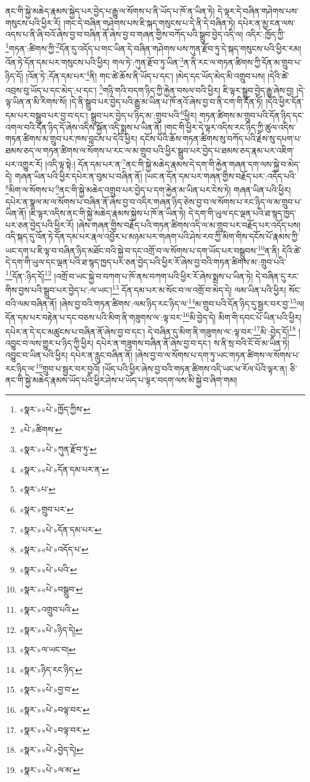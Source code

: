 ནང་གི་སྐྱེ་མཆེད་རྣམས་སྐྱེད་པར་བྱེད་པ་རྒྱུ་ལ་སོགས་པ་ནི་ཡོད་པ་ཁོ་ན་ཡིན་ཏེ། དེ་ལྟར་དེ་བཞིན་གཤེགས་པས་གསུངས་པའི་ཕྱིར་རོ། །གང་དེ་བཞིན་གཤེགས་པས་ཇི་སྐད་གསུངས་པ་དེ་ནི་དེ་བཞིན་ཏེ། དཔེར་ན་མྱ་ངན་ལས་འདས་པ་ནི་ཞི་བའོ་ཞེས་བྱ་བ་བཞིན་ནོ་ཞེས་བྱ་བ་གཞན་གྱིས་བཀོད་པའི་སྒྲུབ་བྱེད་འདི་ལ། འདིར་:ཁྱོད་ཀྱི་\footnote{«སྣར་»«པེ་»ཁྱོད་ཀྱིས་}གཏན་:ཚིགས་ཀྱི་\footnote{«པེ་»ཚིགས་}དོན་དུ་འདོད་པ་གང་ཡིན་དེ་བཞིན་གཤེགས་པས་ཀུན་རྫོབ་ཏུ་དེ་སྐད་གསུངས་པའི་ཕྱིར་རམ། འོན་ཏེ་དོན་དམ་པར་གསུངས་པའི་ཕྱིར། གལ་ཏེ་:ཀུན་རྫོབ་ཏུ་ཡིན་\footnote{«སྣར་»«པེ་»ཀུན་རྫོབ་ཏུ་}ན་ནི་རང་ལ་གཏན་ཚིགས་ཀྱི་དོན་མ་གྲུབ་པ་ཉིད་དོ། །འོན་ཏེ་:དོན་དམ་པར་\footnote{«སྣར་»«པེ་»དོན་དམ་པར་ན་}ནི། གང་ཚེ་ཆོས་ནི་ཡོད་པ་དང་། །མེད་དང་ཡོད་མེད་མི་འགྲུབ་པས། །དེའི་ཚེ་འབྲས་བུ་ཡོད་པ་དང་མེད་:པ་དང་། \footnote{«སྣར་»པ་}གཉི་གའི་བདག་ཉིད་ཀྱི་རྐྱེན་བསལ་བའི་ཕྱིར། ཇི་ལྟར་སྒྲུབ་བྱེད་རྒྱུ་ཞེས་བྱ། །དེ་ལྟ་ཡིན་ན་མི་རིགས་སོ། །དེ་ནི་སྒྲུབ་པར་བྱེད་པའི་རྒྱུ་མ་ཡིན་པ་ཁོ་ནའོ་ཞེས་བྱ་བ་ནི་ངག་གི་དོན་ཏོ། །དེའི་ཕྱིར་དོན་དམ་པར་བསྒྲུབ་པར་བྱ་བ་དང་། སྒྲུབ་པར་བྱེད་པ་ཉིད་མ་:གྲུབ་པའི་\footnote{«སྣར་»གྲུབ་པར་}ཕྱིར། གཏན་ཚིགས་མ་གྲུབ་པའི་དོན་ཉིད་དང་འགལ་བའི་དོན་ཉིད་དོ་ཞེས་འདིས་སྐྱོན་འདི་སྨྲས་པ་ཡིན་ནོ། །གང་གི་ཕྱིར་དེ་ལྟར་འདིས་རང་ཉིད་ཀྱི་ཚུལ་འདིས་གཏན་ཚིགས་མ་གྲུབ་པར་ཁས་བླངས་པ་དེའི་ཕྱིར། དངོས་པོའི་ཆོས་གཏན་ཚིགས་སུ་བཀོད་པའི་རྗེས་སུ་དཔག་པ་ཐམས་ཅད་ལ་གཏན་ཚིགས་ལ་སོགས་པ་རང་ལ་མ་གྲུབ་པའི་ཕྱིར་སྒྲུབ་པར་བྱེད་པ་ཐམས་ཅད་རྣམ་པར་འཇིག་པར་འགྱུར་རོ། །འདི་ལྟ་སྟེ:། དོན་དམ་པར་ན་\footnote{«སྣར་»«པེ་»དོན་དམ་པར་}ནང་གི་སྐྱེ་མཆེད་རྣམས་དེ་དག་གི་རྐྱེན་གཞན་དག་ལས་སྐྱེ་བ་མེད་དེ། གཞན་ཡིན་པའི་ཕྱིར་དཔེར་ན་བུམ་པ་བཞིན་ནོ། །ཡང་ན་དོན་དམ་པར་གཞན་གྱིས་བརྗོད་པར་:འདོད་པའི་\footnote{«སྣར་»«པེ་»འདོད་པ་}མིག་ལ་སོགས་པ་\footnote{«སྣར་»«པེ་»པའི་}ནང་གི་སྐྱེ་མཆེད་འགྲུབ་པར་བྱེད་པ་དག་རྐྱེན་མ་ཡིན་པར་ངེས་ཏེ། གཞན་ཡིན་པའི་ཕྱིར། དཔེར་ན་སྣལ་མ་ལ་སོགས་པ་བཞིན་ནོ་ཞེས་བྱ་བ་འདིར་གཞན་ཉིད་ཅེས་བྱ་བ་ལ་སོགས་པ་རང་ཉིད་ལ་མ་གྲུབ་པ་ཡིན་ནོ། །ཇི་ལྟར་འདིས་ནང་གི་སྐྱེ་མཆེད་རྣམས་སྐྱེས་པ་ཁོ་ན་ཡིན་ཏེ། དེ་དག་གི་ཡུལ་དང་ལྡན་པའི་ཐ་སྙད་ཁྱད་པར་ཅན་བྱེད་པའི་ཕྱིར་རོ། །ཞེས་གཞན་གྱིས་བརྗོད་པའི་གཏན་ཚིགས་འདི་ལ་མ་གྲུབ་པར་བརྗོད་པར་འདོད་པས། འདི་སྐད་དུ་འོན་ཏེ་དོན་དམ་པར་རྣལ་འབྱོར་པ་མཉམ་པར་གཞག་པའི་ཤེས་རབ་ཀྱི་མིག་གིས་དངོས་པོ་རྣམས་ཀྱི་ཡང་དག་པ་ཇི་ལྟ་བ་བཞིན་ཉིད་མཐོང་བའི་སྐྱེ་བ་དང་འགྲོ་བ་ལ་སོགས་པ་དག་ཡོད་པར་བསྒྲུབས་\footnote{«སྣར་»«པེ་»བསྒྲུབ་}ན་ནི། དེའི་ཚེ་དེ་དག་གི་ཡུལ་དང་ལྡན་པའི་ཐ་སྙད་ཁྱད་པར་ཅན་བྱེད་པའི་ཕྱིར་རོ་ཞེས་བྱ་བའི་གཏན་ཚིགས་མ་:གྲུབ་པའི་\footnote{«སྣར་»འགྲུབ་པའི་}དོན་:ཉིད་དོ།\footnote{«སྣར་»«པེ་»ཉིད་དེ།} །འགྲོ་བ་ཡང་སྐྱེ་བ་བཀག་པ་ཁོ་ནས་བཀག་པའི་ཕྱིར་རོ་ཞེས་སྨྲས་པ་ཡིན་ཏེ། དེ་བཞིན་དུ་རང་གིས་བྱས་པའི་སྒྲུབ་པར་བྱེད་པ་:ལ་ཡང་།\footnote{«སྣར་»ལ་ཡང་བ།} དོན་དམ་པར་མ་སོང་བ་ལ་འགྲོ་བ་མེད་དེ། ལམ་ཡིན་པའི་ཕྱིར། སོང་བའི་ལམ་བཞིན་ནོ། །ཞེས་བྱ་བའི་གཏན་ཚིགས་:ལམ་ཉིད་རང་ཉིད་ལ་\footnote{«སྣར་»ཉིད་རང་ཉིད་}མ་གྲུབ་པའི་དོན་ཉིད་དུ་སྦྱར་བར་བྱ་\footnote{«སྣར་»«པེ་»བྱ་བ་}ལ། དོན་དམ་པར་བརྟེན་པ་དང་བཅས་པའི་མིག་ནི་གཟུགས་ལ་:ལྟ་བར་\footnote{«སྣར་»«པེ་»བལྟ་བར་}མི་བྱེད་དེ། མིག་གི་དབང་པོ་ཡིན་པའི་ཕྱིར། དཔེར་ན་དེ་དང་མཚུངས་པ་བཞིན་ནོ་ཞེས་བྱ་བ་དང་། དེ་བཞིན་དུ་མིག་ནི་གཟུགས་ལ་:ལྟ་བར་\footnote{«སྣར་»«པེ་»བལྟ་བར་}མི་:བྱེད་དོ།\footnote{«སྣར་»«པེ་»བྱེད་དེ།} །འབྱུང་བ་ལས་གྱུར་པ་ཉིད་ཀྱི་ཕྱིར། དཔེར་ན་གཟུགས་བཞིན་ནོ་ཞེས་བྱ་བ་དང་། ས་ནི་སྲ་བའི་ངོ་བོ་མ་ཡིན་ཏེ། འབྱུང་བ་ཡིན་པའི་ཕྱིར། དཔེར་ན་རླུང་བཞིན་ནོ། །ཞེས་བྱ་བ་ལ་སོགས་པ་དག་ཏུ་ཡང་གཏན་ཚིགས་ལ་སོགས་པ་རང་ཉིད་ལ་\footnote{«སྣར་»«པེ་»ལ་མ་}གྲུབ་པ་སྦྱར་བར་བྱའོ། །ཡོད་པའི་ཕྱིར་ཞེས་བྱ་བའི་གཏན་ཚིགས་འདི་ཡང་ཕ་རོལ་པོའི་ལྟར་ན། ཅི་ནང་གི་སྐྱེ་མཆེད་རྣམས་ཡོད་པའི་ཕྱིར་ཤེས་པ་ཡོད་པ་ལྟར་བདག་ལས་མི་སྐྱེ་བ་ཞིག་གམ། 
